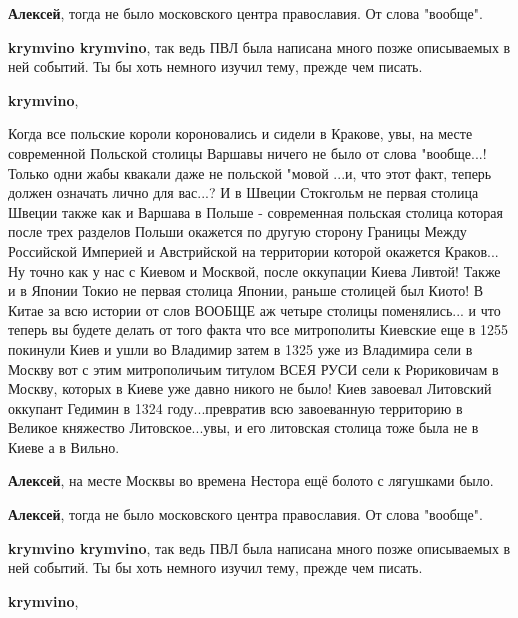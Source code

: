 \begin{itemize}
\begin{itemize} %
\textbf{Алексей}, тогда не было московского центра православия. От слова "вообще".

\textbf{krymvino krymvino}, так ведь ПВЛ была написана много позже описываемых в ней событий. Ты бы хоть немного изучил тему, прежде чем писать.

\textbf{krymvino}, 

Когда все польские короли короновались и сидели в Кракове, увы, на месте
современной Польской столицы Варшавы ничего не было от слова "вообще...! Только
одни жабы квакали даже не польской "мовой ...и, что этот факт, теперь должен
означать лично для вас...? И в Швеции Стокгольм не первая столица Швеции также
как и Варшава в Польше - современная польская столица которая после трех
разделов Польши окажется по другую сторону Границы Между Российской Империей и
Австрийской на территории которой окажется Краков... Ну точно как у нас с
Киевом и Москвой, после оккупации Киева Ливтой! Также и в Японии Токио не
первая столица Японии, раньше столицей был Киото! В Китае за всю истории от
слов ВООБЩЕ аж четыре столицы поменялись... и что теперь вы будете делать от
того факта что все митрополиты Киевские еще в 1255 покинули Киев и ушли во
Владимир затем в 1325 уже из Владимира сели в Москву вот с этим митрополичьим
титулом ВСЕЯ РУСИ сели к Рюриковичам в Москву, которых в Киеве уже давно никого
не было! Киев завоевал Литовский оккупант Гедимин в 1324 году...превратив всю
завоеванную территорию в Великое княжество Литовское...увы, и его литовская
столица тоже была не в Киеве а в Вильно.

\textbf{Алексей}, на месте Москвы во времена Нестора ещё болото с лягушками было.

\end{itemize} %

\begin{itemize} %


\textbf{Алексей}, тогда не было московского центра православия. От слова "вообще".

\textbf{krymvino krymvino}, так ведь ПВЛ была написана много позже описываемых в ней событий. Ты бы хоть немного изучил тему, прежде чем писать.

\textbf{krymvino}, 


\end{itemize}
\end{itemize}
